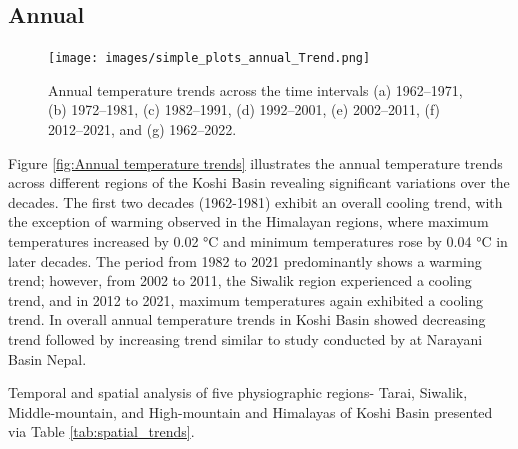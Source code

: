 \subsection*{Annual}

\begin{figure}[H] 
  \centering
  \texttt{[image: images/simple\_plots\_annual\_Trend.png]}  
  \caption{Annual temperature trends across the time intervals (a) 1962–1971, (b) 1972–1981, (c) 1982–1991, (d) 1992–2001, (e) 2002–2011, (f) 2012–2021, and (g) 1962–2022.} 
  \label{fig:Annual_temperature_trends}  
\end{figure}

Figure \ref{fig:Annual temperature trends} illustrates the annual temperature trends across different regions of the Koshi Basin revealing significant variations over the decades. The first two decades (1962-1981) exhibit an overall cooling trend, with the exception of warming observed in the Himalayan regions, where maximum temperatures increased by 0.02 °C and minimum temperatures rose by 0.04 °C in later decades. The period from 1982 to 2021 predominantly shows a warming trend; however, from 2002 to 2011, the Siwalik region experienced a cooling trend, and in 2012 to 2021, maximum temperatures again exhibited a cooling trend. In overall annual temperature trends in Koshi Basin showed decreasing trend followed by increasing trend similar to study conducted by \textcite{chand_trend_2019} at Narayani Basin Nepal. 


Temporal and spatial analysis of five physiographic regions- Tarai, Siwalik, Middle-mountain, and High-mountain and Himalayas of Koshi Basin presented via Table \ref{tab:spatial_trends}.

